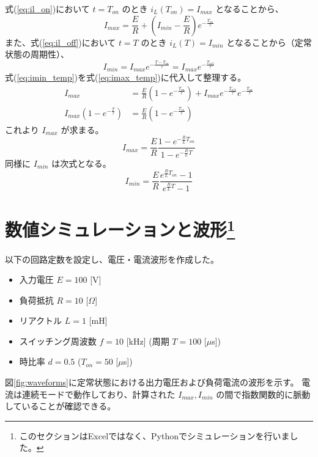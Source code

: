 \documentclass[a4paper,10pt]{article}
\begin{document}
式(\ref{eq:il_on})において $t=T_{on}$ のとき $i_L(T_{on}) = I_{max}$ となることから、
\begin{equation}
    I_{max} = \frac{E}{R} + \left( I_{min} - \frac{E}{R} \right) e^{-\frac{T_{on}}{\tau}}
    \label{eq:imax_temp}
\end{equation}
また、式(\ref{eq:il_off})において $t=T$ のとき $i_L(T) = I_{min}$ となることから（定常状態の周期性）、
\begin{equation}
    I_{min} = I_{max} e^{-\frac{T - T_{on}}{\tau}} = I_{max} e^{-\frac{T_{off}}{\tau}}
    \label{eq:imin_temp}
\end{equation}
式(\ref{eq:imin_temp})を式(\ref{eq:imax_temp})に代入して整理する。
\begin{align}
    I_{max} &= \frac{E}{R} (1 - e^{-\frac{T_{on}}{\tau}}) + I_{max} e^{-\frac{T_{off}}{\tau}} e^{-\frac{T_{on}}{\tau}} \\
    I_{max} (1 - e^{-\frac{T}{\tau}}) &= \frac{E}{R} (1 - e^{-\frac{T_{on}}{\tau}})
\end{align}
これより $I_{max}$ が求まる。
\begin{equation}
    I_{max} = \frac{E}{R} \frac{1 - e^{-\frac{R}{L} T_{on}}}{1 - e^{-\frac{R}{L} T}}
\end{equation}
同様に $I_{min}$ は次式となる。
\begin{equation}
    I_{min} = \frac{E}{R} \frac{e^{\frac{R}{L} T_{on}} - 1}{e^{\frac{R}{L} T} - 1}
\end{equation}

\section{数値シミュレーションと波形\footnote{このセクションはExcelではなく、Pythonでシミュレーションを行いました。}}
以下の回路定数を設定し、電圧・電流波形を作成した。

\begin{itemize}
    \item 入力電圧 $E = 100$ [V]
    \item 負荷抵抗 $R = 10$ [$\Omega$]
    \item リアクトル $L = 1$ [mH]
    \item スイッチング周波数 $f = 10$ [kHz] (周期 $T = 100$ [$\mu$s])
    \item 時比率 $d = 0.5$ ($T_{on} = 50$ [$\mu$s])
\end{itemize}

図\ref{fig:waveforms}に定常状態における出力電圧および負荷電流の波形を示す。
電流は連続モードで動作しており、計算された $I_{max}, I_{min}$ の間で指数関数的に脈動していることが確認できる。
\end{document}
